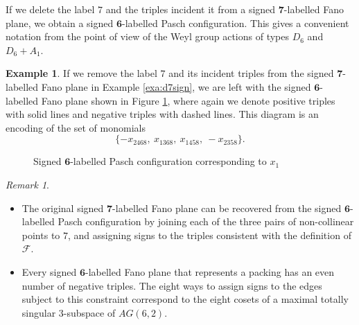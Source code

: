 \documentclass{amsart}
\theoremstyle{plain}
\theoremstyle{definition}
\newtheorem{exa}[theorem]{Example}
\theoremstyle{remark}
\newtheorem{rmk}[theorem]{Remark}
\numberwithin{equation}{section}
\newcommand{\calf}{\mathcal{F}}
\newcommand{\six}{{\mathbf 6}}
\newcommand{\seven}{{\mathbf 7}}
\begin{document}
If we delete the label $7$ and the triples incident it from a signed $\seven$-labelled Fano plane, we obtain a signed
$\six$-labelled Pasch configuration. This gives a convenient notation from the point of view of the Weyl group actions of
types $D_6$ and $D_6 + A_1$.

\begin{exa}\label{exa:d6sign}
If we remove the label $7$ and its incident triples from the signed $\seven$-labelled Fano plane in Example \ref{exa:d7sign},
we are left with the signed $\six$-labelled Fano plane shown in Figure \ref{fig:d6sign}, where again we denote positive 
triples with solid lines and negative triples with dashed lines. This diagram is an encoding of the set of monomials $$
 \{
-x_{2468}, \ 
x_{1368}, \ 
x_{1458}, \ 
-x_{2358}
\}.$$ 
\begin{figure}
\begin{center}
       \caption{Signed $\six$-labelled Pasch configuration corresponding to $x_1$}
\label{fig:d6sign}
\end{center}
\end{figure}
\end{exa}

\begin{rmk}\label{rmk:pasch}
\begin{itemize}
\item[{\rm (i)}]{ The original signed $\seven$-labelled Fano plane can be recovered from the signed $\six$-labelled
Pasch configuration by joining each of the three pairs of non-collinear points to $7$, and assigning signs to the 
triples consistent with the definition of $\calf$.}
\item[{\rm (ii)}]{Every signed $\six$-labelled Fano plane that represents a packing has an even number of negative 
triples. The eight ways to assign signs to the edges subject to this constraint correspond to the eight cosets of 
a maximal totally singular $3$-subspace of $AG(6, 2)$.}
\end{itemize}

\end{rmk}
\end{document}
